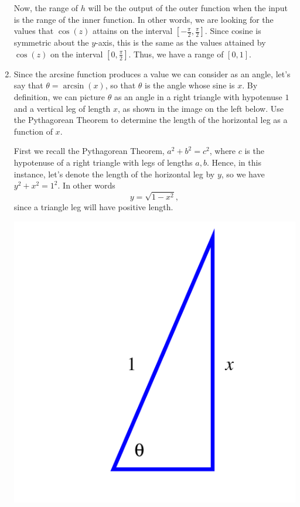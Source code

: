 \documentclass{ximera}
\begin{document}
\begin{example}
\begin{enumerate}
\begin{explanation}
Now, the range of $h$ will be the output of the outer function when the input is the range of the inner function. In other words, we are looking for the values that $\cos(z)$ attains on the interval $\left[-\frac{\pi}{2},\frac{\pi}{2}\right]$. Since cosine is symmetric about the $y$-axis, this is the same as the values attained by $\cos(z)$ on the interval $\left[0,\frac{\pi}{2}\right]$. Thus, we have a range of $[0,1]$.
\end{explanation}
%
\item Since the arcsine function produces a value we can consider as an angle, let's say that $\theta = \arcsin(x)$,  so that $\theta$ is the angle whose sine is $x$.  By definition, we can picture $\theta$ as an angle in a right triangle with hypotenuse $1$ and a vertical leg of length $x$, as shown in the image on the left below.  Use the Pythagorean Theorem to determine the length of the horizontal leg as a function of $x$. \\
%
\begin{explanation}
First we recall the Pythagorean Theorem, $a^2 +b^2 = c^2$, where $c$ is the hypotenuse of a right triangle with legs of lengths $a,b$. Hence, in this instance, let's denote the length of the horizontal leg by $y$, so we have $y^2 + x^2 = 1^2$. In other words
%
$$y = \sqrt{1-x^2},$$
%
since a triangle leg will have positive length.
\end{explanation}
%
\begin{image}
\includegraphics{inv-trig-cosarcsin.png}

\end{image}
\end{enumerate}
\end{example}
\end{document}
